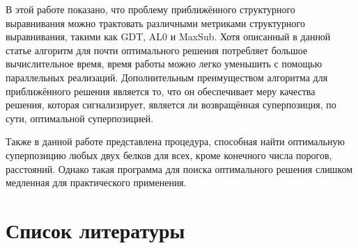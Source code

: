 \documentclass[a4paper]{extreport}
\begin{document}
В этой работе показано, что проблему приближённого структурного выравнивания можно трактовать различными метриками структурного выравнивания, такими как GDT, AL0 и MaxSub. Хотя описанный в данной статье алгоритм для почти оптимального решения потребляет большое вычислительное время, время работы можно легко уменьшить с помощью параллельных реализаций. Дополнительным преимуществом алгоритма для приближённого решения является то, что он обеспечивает меру качества решения, которая сигнализирует, является ли возвращённая суперпозиция, по сути, оптимальной суперпозицией.

Также в данной работе представлена процедура, способная найти оптимальную суперпозицию любых двух белков для всех, кроме конечного числа порогов, расстояний. Однако такая программа для поиска оптимального решения слишком медленная для практического применения.

\newpage
{}

\chapter*{ Список литературы}
\end{document}
